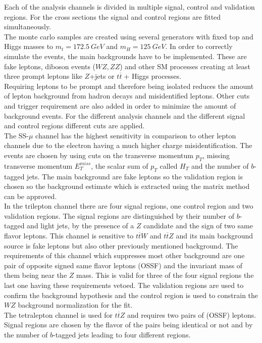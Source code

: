 \documentclass[11pt, twocolumn, a4paper]{article}
\newcommand{\ttbars}{${t \overline{t} \; }$}
\newcommand{\ttW}{{t \overline{t} W }}
\newcommand{\ttZ}{{t \overline{t} Z }}
\begin{document}
Each of the analysis channels is divided in multiple signal, control and validation regions.
For the cross sections the signal and control regions are fitted simultaneously.\\
%
%
The monte carlo samples are created using several generators with fixed top and Higgs masses to $m_t=\SI{172.5}{GeV}$ and $m_H=\SI{125}{GeV}.$
In order to correctly simulate the events, the main backgrounds have to be implemented.
These are fake leptons, diboson events ($WZ,ZZ$) and other SM processes creating at least three prompt leptons like $Z$+jets or \ttbars + Higgs processes.\\
\FloatBarrier
%
Requiring leptons to be prompt and therefore being isolated reduces the amount of lepton background from hadron decays and misidentified leptons.
Other cuts and trigger requirement are also added in order to minimize the amount of background events.
For the different analysis channels and the different signal and control regions different cuts are applied.\\
The SS-$\mu$ channel has the highest sensitivity in comparison to other lepton channels due to the electron having a much higher charge misidentification.
The events are chosen by using cuts on the transverse momentum $p_T$, missing transverse momentum $E_T^{miss}$, the scalar sum of $p_T$ called $H_T$ and the number of $b$-tagged jets. 
The main background are fake leptons so the validation region is chosen so the background estimate which is extracted using the matrix method \cite{MM} can be approved.\\
%
In the trilepton channel there are four signal regions, one control region and two validation regions.
The signal regions are distinguished by their number of $b$-tagged and light jets, by the presence of a $Z$ candidate and the sign of two same flavor leptons.
This channel is sensitive to $\ttW$ and $\ttZ$ and its main background source is fake leptons but also other previously mentioned background.
The requirements of this channel which suppresses most other background are one pair of opposite signed same flavor leptons (OSSF) and the invariant mass of them being near the $Z$ mass.
This is valid for three of the four signal regions the last one having these requirements vetoed.
The validation regions are used to confirm the background hypothesis and the control region is used to constrain the $WZ$ background normalization for the fit.\\
%
The tetralepton channel is used for $\ttZ$ and requires two pairs of (OSSF) leptons.
Signal regions are chosen by the flavor of the pairs being identical or not and by the number of $b$-tagged jets leading to four different regions.
\end{document}
